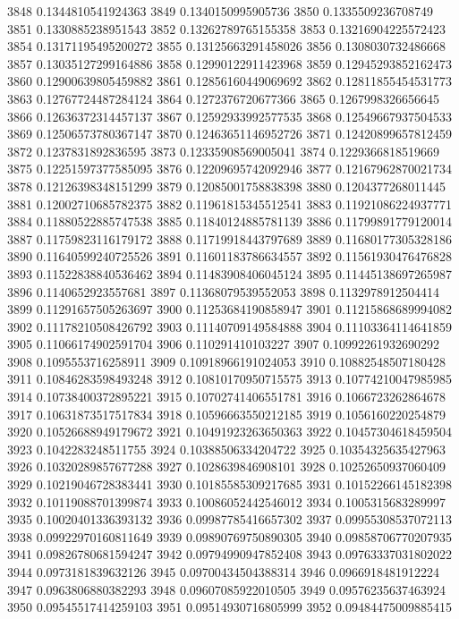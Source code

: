 3848 0.1344810541924363
3849 0.1340150995905736
3850 0.1335509236708749
3851 0.1330885238951543
3852 0.13262789765155358
3853 0.13216904225572423
3854 0.13171195495200272
3855 0.13125663291458026
3856 0.1308030732486668
3857 0.13035127299164886
3858 0.12990122911423968
3859 0.12945293852162473
3860 0.12900639805459882
3861 0.12856160449069692
3862 0.12811855454531773
3863 0.12767724487284124
3864 0.1272376720677366
3865 0.1267998326656645
3866 0.12636372314457137
3867 0.12592933992577535
3868 0.12549667937504533
3869 0.12506573780367147
3870 0.12463651146952726
3871 0.12420899657812459
3872 0.1237831892836595
3873 0.12335908569005041
3874 0.1229366818519669
3875 0.12251597377585095
3876 0.12209695742092946
3877 0.12167962870021734
3878 0.12126398348151299
3879 0.12085001758838398
3880 0.1204377268011445
3881 0.12002710685782375
3882 0.11961815345512541
3883 0.11921086224937771
3884 0.11880522885747538
3885 0.11840124885781139
3886 0.11799891779120014
3887 0.11759823116179172
3888 0.11719918443797689
3889 0.11680177305328186
3890 0.11640599240725526
3891 0.11601183786634557
3892 0.11561930476476828
3893 0.11522838840536462
3894 0.11483908406045124
3895 0.11445138697265987
3896 0.1140652923557681
3897 0.11368079539552053
3898 0.1132978912504414
3899 0.11291657505263697
3900 0.11253684190858947
3901 0.11215868689994082
3902 0.11178210508426792
3903 0.11140709149584888
3904 0.11103364114641859
3905 0.11066174902591704
3906 0.110291410103227
3907 0.10992261932690292
3908 0.1095553716258911
3909 0.10918966191024053
3910 0.10882548507180428
3911 0.10846283598493248
3912 0.10810170950715575
3913 0.10774210047985985
3914 0.10738400372895221
3915 0.10702741406551781
3916 0.1066723262864678
3917 0.10631873517517834
3918 0.10596663550212185
3919 0.1056160220254879
3920 0.10526688949179672
3921 0.10491923263650363
3922 0.10457304618459504
3923 0.1042283248511755
3924 0.10388506334204722
3925 0.10354325635427963
3926 0.10320289857677288
3927 0.1028639846908101
3928 0.10252650937060409
3929 0.10219046728383441
3930 0.10185585309217685
3931 0.10152266145182398
3932 0.10119088701399874
3933 0.10086052442546012
3934 0.1005315683289997
3935 0.10020401336393132
3936 0.09987785416657302
3937 0.09955308537072113
3938 0.09922970160811649
3939 0.09890769750890305
3940 0.09858706770207935
3941 0.09826780681594247
3942 0.09794990947852408
3943 0.09763337031802022
3944 0.0973181839632126
3945 0.09700434504388314
3946 0.0966918481912224
3947 0.0963806880382293
3948 0.09607085922010505
3949 0.09576235637463924
3950 0.09545517414259103
3951 0.09514930716805999
3952 0.09484475009885415
